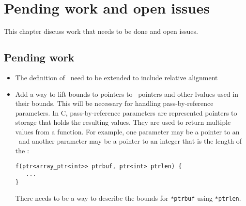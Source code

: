 
\chapter{Pending work and open issues}
\label{chapter:open-issues}

This chapter discuss work that needs to be done and open issues.

\section{Pending work}

\begin{itemize}
\item The definition of \arrayviewT\ need to be extended to include
      relative alignment
\item Add a way to lift bounds to pointers to \arrayptr\ pointers
      and other lvalues used in their bounds.  This will be 
      necessary for handling pass-by-reference parameters.
      In C, pass-by-reference parameters are represented pointers
      to storage that holds the resulting values.  They are
      used to return multiple values from a function.
      For example, one parameter may be a pointer to an 
      \arrayptr\ and another parameter may be a pointer to an 
      integer that is the length of the \arrayptr:
\begin{verbatim}
f(ptr<array_ptr<int>> ptrbuf, ptr<int> ptrlen) {
   ...
}
\end{verbatim}
       There needs to be a way to describe the bounds for
       \texttt{*ptrbuf} using \texttt{*ptrlen}.
       

\end{itemize}
